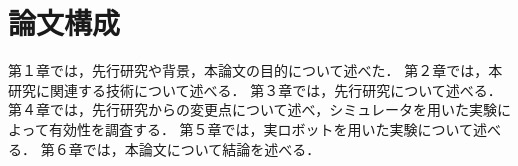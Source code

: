 \section{論文構成}
第１章では，先行研究や背景，本論文の目的について述べた．
第２章では，本研究に関連する技術について述べる．
第３章では，先行研究について述べる．
第４章では，先行研究からの変更点について述べ，シミュレータを用いた実験によって有効性を調査する．
第５章では，実ロボットを用いた実験について述べる．
第６章では，本論文について結論を述べる．